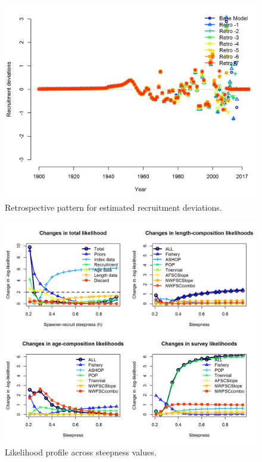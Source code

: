 \documentclass[12pt,]{article}
\begin{document}
\begin{figure}
\centering
\includegraphics{Figures/compare9_recdevs.png}
\caption{Retrospective pattern for estimated recruitment deviations.
\label{fig:retro_recdev}}
\end{figure}

\FloatBarrier

\begin{figure}
\centering
\includegraphics{Figures/piner_panel_h.png}
\caption{Likelihood profile across steepness values.
\label{fig:piner_h}}
\end{figure}
\end{document}
